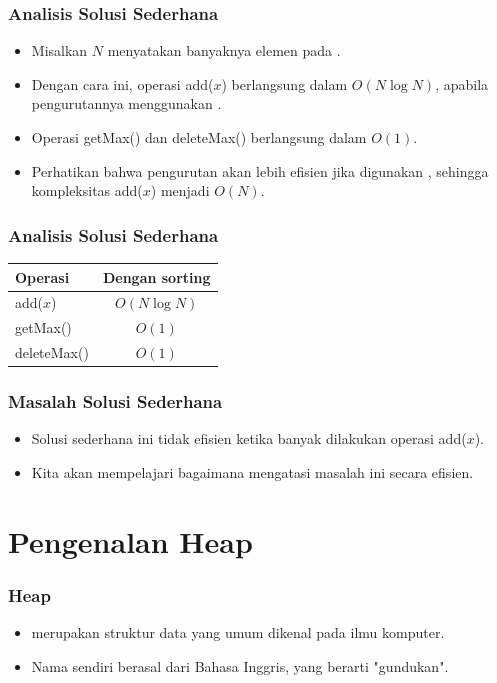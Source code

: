 \begin{frame}
\frametitle{Analisis Solusi Sederhana}
\begin{itemize}
  \item Misalkan $N$ menyatakan banyaknya elemen pada \farray.
  \item Dengan cara ini, operasi add($x$) berlangsung dalam $O(N \log{N})$, apabila pengurutannya menggunakan .
  \item Operasi getMax() dan deleteMax() berlangsung dalam $O(1)$.
  \newline
  \item Perhatikan bahwa pengurutan akan lebih efisien jika digunakan , sehingga kompleksitas add($x$) menjadi $O(N)$.
\end{itemize}
\end{frame}

\begin{frame}
\frametitle{Analisis Solusi Sederhana}
\begin{table}[ht]
  \begin{tabular}{|l|c|}
    \hline Operasi  & Dengan sorting\\
    \hline  add($x$) & $O(N \log{N})$  \\
    \hline  getMax() & $O(1)$ \\
    \hline  deleteMax() & $O(1)$ \\
    \hline
  \end{tabular}
\end{table}  
\end{frame}

\begin{frame}
\frametitle{Masalah Solusi Sederhana}
\begin{itemize}
  \item Solusi sederhana ini tidak efisien ketika banyak dilakukan operasi add($x$).
  \item Kita akan mempelajari bagaimana \pheap mengatasi masalah ini secara efisien.
\end{itemize}
\end{frame}

\section{Pengenalan Heap}
\frame{\sectionpage}

\begin{frame}
\frametitle{Heap}
\begin{itemize}
  \item \pHeap merupakan struktur data yang umum dikenal pada ilmu komputer.
  \item Nama \pheap sendiri berasal dari Bahasa Inggris, yang berarti "gundukan". 
\end{itemize}
\end{frame}

